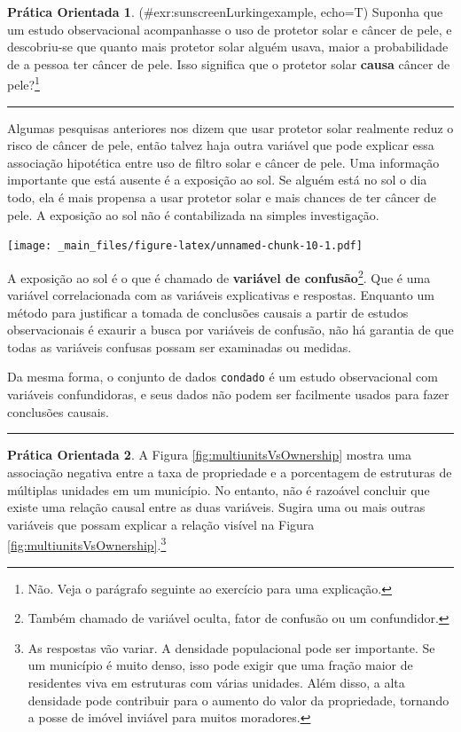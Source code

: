 \documentclass[
]{book}
\theoremstyle{definition}
\theoremstyle{definition}
\theoremstyle{definition}
\newtheorem{exercise}{Prática Orientada}[chapter]
\theoremstyle{definition}
\theoremstyle{remark}
\begin{document}
\begin{exercise}
\protect\hypertarget{exr:sunscreenLurkingexampleux2cux20echo=T}{}{(\#exr:sunscreenLurkingexample, echo=T) }Suponha que um estudo observacional acompanhasse o uso de protetor solar e câncer de pele, e descobriu-se que quanto mais protetor solar alguém usava, maior a probabilidade de a pessoa ter câncer de pele. Isso significa que o protetor solar \textbf{causa} câncer de pele?\footnote{Não. Veja o parágrafo seguinte ao exercício para uma explicação.}
\end{exercise}

\begin{center}\rule{0.5\linewidth}{0.5pt}\end{center}

Algumas pesquisas anteriores nos dizem que usar protetor solar realmente reduz o risco de câncer de pele, então talvez haja outra variável que pode explicar essa associação hipotética entre uso de filtro solar e câncer de pele. Uma informação importante que está ausente é a exposição ao sol. Se alguém está no sol o dia todo, ela é mais propensa a usar protetor solar e mais chances de ter câncer de pele. A exposição ao sol não é contabilizada na simples investigação.

\texttt{[image: \_main\_files/figure-latex/unnamed-chunk-10-1.pdf]}

A exposição ao sol é o que é chamado de \textbf{variável de confusão}\footnote{Também chamado de variável oculta, fator de confusão ou um confundidor.}. Que é uma variável correlacionada com as variáveis explicativas e respostas. Enquanto um método para justificar a tomada de conclusões causais a partir de estudos observacionais é exaurir a busca por variáveis de confusão, não há garantia de que todas as variáveis confusas possam ser examinadas ou medidas.

Da mesma forma, o conjunto de dados \texttt{condado} é um estudo observacional com variáveis confundidoras, e seus dados não podem ser facilmente usados para fazer conclusões causais.

\begin{center}\rule{0.5\linewidth}{0.5pt}\end{center}

\begin{exercise}
\protect\hypertarget{exr:unnamed-chunk-11}{}{\label{exr:unnamed-chunk-11} }A Figura \ref{fig:multiunitsVsOwnership} mostra uma associação negativa entre a taxa de propriedade e a porcentagem de estruturas de múltiplas unidades em um município. No entanto, não é razoável concluir que existe uma relação causal entre as duas variáveis. Sugira uma ou mais outras variáveis que possam explicar a relação visível na Figura \ref{fig:multiunitsVsOwnership}.\footnote{As respostas vão variar. A densidade populacional pode ser importante. Se um município é muito denso, isso pode exigir que uma fração maior de residentes viva em estruturas com várias unidades. Além disso, a alta densidade pode contribuir para o aumento do valor da propriedade, tornando a posse de imóvel inviável para muitos moradores.}
\end{exercise}
\end{document}
